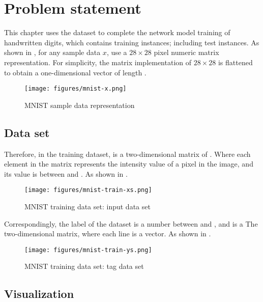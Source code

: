 \section{Problem statement}
\begin{content}
This chapter uses the  dataset to complete the network model training of handwritten digits, which contains  training instances; including  test instances. As shown in , for any sample data $x$, use a $28 \times 28$ pixel numeric matrix representation. For simplicity, the matrix implementation of $28 \times 28$ is flattened to obtain a one-dimensional vector of length .

\begin{figure}[H]
  \centering
  \texttt{[image: figures/mnist-x.png]}
  \caption{MNIST sample data representation}
  \label{fig:mnist-x}
\end{figure}


\subsection{Data set}
Therefore, in the  training dataset,  is a two-dimensional matrix of \code{[60000, 784]}. Where each element in the matrix represents the intensity value of a pixel in the image, and its value is between  and . As shown in .

\begin{figure}[H]
  \centering
  \texttt{[image: figures/mnist-train-xs.png]}
  \caption{MNIST training data set: input data set}
  \label{fig:mnist-train-xs}
\end{figure}

Correspondingly, the label of the  dataset is a number between  and , and  is a \code{[60000, 10]} The two-dimensional matrix, where each line is a  vector. As shown in .

\begin{figure}[H]
  \centering
  \texttt{[image: figures/mnist-train-ys.png]}
  \caption{MNIST training data set: tag data set}
  \label{fig:mnist-train-ys}
\end{figure}


\subsection{Visualization}
\begin{content}


\end{content}
\end{content}
